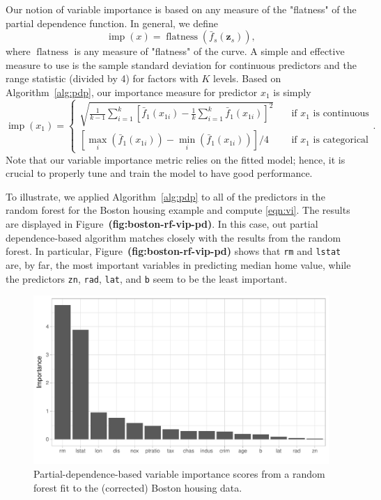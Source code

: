 \documentclass[12pt]{article}
\def\code#1{\texttt{#1}}
\def\ref#1{\textbf{(#1)}}
\DeclareMathOperator{\flatness}{flatness}
\DeclareMathOperator{\imp}{imp}
\begin{document}
Our notion of variable importance is based on any measure of the "flatness" of the partial dependence function. In general, we define
\begin{equation*}
  \imp\left(x\right) = \flatness\left(\bar{f}_s\left(\boldsymbol{z}_s\right)\right),
\end{equation*}
where $\flatness$ is any measure of "flatness" of the curve. A simple and effective measure to use is the sample standard deviation for continuous predictors and the range statistic (divided by 4) for factors with $K$ levels. Based on Algorithm~\eqref{alg:pdp}, our importance measure for predictor $x_1$ is simply
\begin{equation}
\label{eqn:vi}
  \imp\left(x_1\right) = 
  \begin{cases}
    \sqrt{\frac{1}{k - 1}\sum_{i = 1}^k\left[\bar{f}_1\left(x_{1i}\right) - \frac{1}{k}\sum_{i = 1}^k\bar{f}_1\left(x_{1i}\right)\right] ^ 2} & \quad \text{if } x_1 \text{ is continuous}\\
    \left[\max_i\left(\bar{f}_1\left(x_{1i}\right)\right) - \min_i\left(\bar{f}_1\left(x_{1i}\right)\right)\right] / 4 & \quad \text{if } x_1 \text{ is categorical}
  \end{cases}.
\end{equation}
Note that our variable importance metric relies on the fitted model; hence, it is crucial to properly tune and train the model to have good performance.

To illustrate, we applied Algorithm~\eqref{alg:pdp} to all of the predictors in the random forest for the Boston housing example and compute \eqref{eqn:vi}. The results are displayed in Figure~\ref{fig:boston-rf-vip-pd}. In this case, out partial dependence-based algorithm matches closely with the results from the random forest. In particular, Figure~\ref{fig:boston-rf-vip-pd} shows that \code{rm} and \code{lstat} are, by far, the most important variables in predicting median home value, while the predictors \code{zn}, \code{rad}, \code{lat}, and \code{b} seem to be the least important.

\begin{figure}[!htb]
  \centering
  \includegraphics[width=1.0\textwidth]{boston-rf-vip-pd}
  \caption{Partial-dependence-based variable importance scores from a random forest fit to the (corrected) Boston housing data. \label{fig:boston-rf-vip-pd}}
\end{figure}
\end{document}
